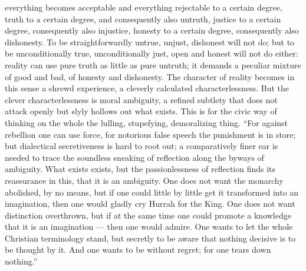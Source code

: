 \documentclass[12pt,a4paper,openany]{book}
\newcommand{\opage}[1]{\marginnote{\footnotesize\textit{[#1]}}}
\begin{document}
everything becomes acceptable and everything rejectable to a certain degree,
truth to a certain degree, and consequently also
untruth, justice to a certain degree, consequently also
injustice, honesty to a certain degree, consequently also
dishonesty. To be straightforwardly untrue, unjust, dishonest
will not do; but to be unconditionally true, unconditionally
just, open and honest will not do either: reality
can use pure truth as little as pure
untruth; it demands a peculiar mixture of good
and bad, of honesty and dishonesty. The character of reality
becomes in this sense a shrewd experience,
a cleverly calculated characterlessness. But the clever characterlessness
is moral ambiguity, a refined subtlety
that does not attack openly but slyly
hollows out what exists. This is for the civic way of thinking
on the whole the lulling, stupefying, demoralizing thing.
``For against rebellion one can use force,
for notorious false speech the punishment is in store; but dialectical
secretiveness is hard to root out;
a comparatively finer ear is needed to trace
the soundless sneaking of reflection along the byways of ambiguity.
What exists exists, but the passionlessness of reflection
finds its reassurance in this, that it is an ambiguity.
\setcounter{footnote}{0}%
\opage{11}One does not want the monarchy abolished, by no means,
but if one could little by little get it transformed
into an imagination, then one would gladly cry
Hurrah for the King. One does not want distinction
overthrown, but if at the same time one could promote
a knowledge that it is an imagination --- then one would
admire. One wants to let the whole Christian terminology
stand, but secretly to be aware
that nothing decisive is to be thought by it. And
one wants to be without regret; for one tears down nothing.''
\end{document}

